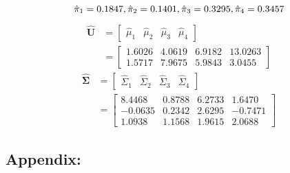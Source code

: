 \documentclass[a4paper]{article}
\begin{document}
\begin{equation}
	\hat{\pi}_1 = 0.1847, \hat{\pi}_2 = 0.1401, \hat{\pi}_3 = 0.3295, \hat{\pi}_4 = 0.3457\\
\end{equation}
\begin{align}
	\mathbf{\hat{U}} &= \begin{bmatrix}
							\hat{\mu}_1 & \hat{\mu}_2 & \hat{\mu}_3 & \hat{\mu}_4 
						\end{bmatrix} \\
					 & = \begin{bmatrix}
							1.6026  &  4.0619  &  6.9182  & 13.0263\\
						    1.5717  &  7.9675  &  5.9843  &  3.0455
						 \end{bmatrix}
\end{align}
\begin{align}
	\mathbf{\hat{\Sigma}} &= \begin{bmatrix}
								\hat{\Sigma}_1 & \hat{\Sigma}_2 & \hat{\Sigma}_3 & \hat{\Sigma}_4 
							 \end{bmatrix} \\
						  & = \begin{bmatrix}
									8.4468  &  0.8788  &  6.2733  &  1.6470 \\
								   -0.0635  &  0.2342  &  2.6295  & -0.7471 \\
								    1.0938  &  1.1568  &  1.9615  &  2.0688
						 	  \end{bmatrix}
\end{align}

\newpage
\subsection*{Appendix:}
	
	
	
	
	
	
	
	
	
	
	
\end{document}
